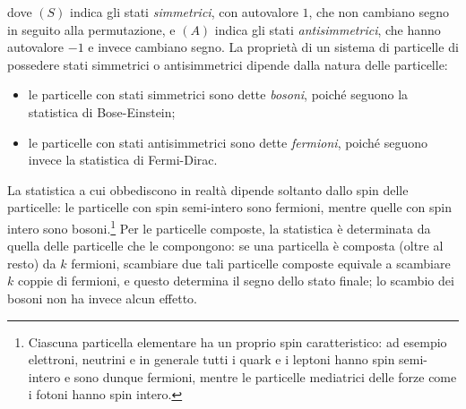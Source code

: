 dove $(S)$ indica gli stati \emph{simmetrici}, con autovalore $1$, che non cambiano segno in seguito alla permutazione, e $(A)$ indica gli stati \emph{antisimmetrici}, che hanno autovalore $-1$ e invece cambiano segno.
La proprietà di un sistema di particelle di possedere stati simmetrici o antisimmetrici dipende dalla natura delle particelle:
\begin{itemize}
    \item le particelle con stati simmetrici sono dette \emph{bosoni}, poich\'e seguono la statistica di Bose-Einstein;
    \item le particelle con stati antisimmetrici sono dette \emph{fermioni}, poich\'e seguono invece la statistica di Fermi-Dirac.
\end{itemize}
La statistica a cui obbediscono in realtà dipende soltanto dallo spin delle particelle: le particelle con spin semi-intero sono fermioni, mentre quelle con spin intero sono bosoni.\footnote{
    Ciascuna particella elementare ha un proprio spin caratteristico: ad esempio elettroni, neutrini e in generale tutti i quark e i leptoni hanno spin semi-intero e sono dunque fermioni, mentre le particelle mediatrici delle forze come i fotoni hanno spin intero.
}
Per le particelle composte, la statistica è determinata da quella delle particelle che le compongono: se una particella è composta (oltre al resto) da $k$ fermioni, scambiare due tali particelle composte equivale a scambiare $k$ coppie di fermioni, e questo determina il segno dello stato finale; lo scambio dei bosoni non ha invece alcun effetto.
